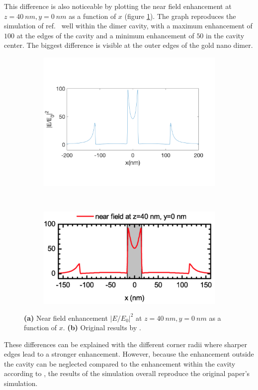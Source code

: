 This difference is also noticeable by plotting the near field enhancement at $z = \SI{40}{nm}, y = \SI{0}{nm}$ as a function of $x$ (figure \ref{fig:yline}). The graph reproduces the simulation of ref.~\cite{heeg} well within the dimer cavity, with a maximum enhancement of $100$ at the edges of the cavity and a minimum enhancement of $50$ in the cavity center. The biggest difference is visible at the outer edges of the gold nano dimer.

\begin{figure}[!h]
  \centering
  \begin{subfigure}{0.45\textwidth}
    \includegraphics[width=\textwidth]{./images/40nm-y.png}
  \end{subfigure}
  ~
  \begin{subfigure}{0.45\textwidth}
    \includegraphics[width=\textwidth]{./images/heeg-y-line.png}
  \end{subfigure}
  \caption{\textbf{(a)} Near field enhancement $|E/E_0|^2$ at $z = \SI{40}{nm}, y = \SI{0}{nm}$ as a function of $x$. \textbf{(b)} Original results by \cite{heeg}.}
  \label{fig:yline}
\end{figure}

These differences can be explained with the different corner radii where sharper edges lead to a stronger enhancement. However, because the  enhancement outside the cavity can be neglected compared to the enhancement within the cavity according to \cite{heeg}, the results of the simulation overall reproduce the original paper's simulation.
